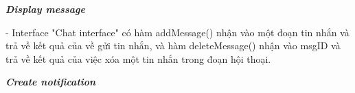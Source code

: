 \documentclass[a4paper]{article}
\begin{document}
\begin{itemize}
\begin{minipage}[b]{0.4\textwidth}
\end{minipage}
\hfill
{}
\newline
\newline
\textbf{\textit{Display message}} \\
\begin{minipage}[b]{0.4\textwidth}
- Interface "Chat interface" có hàm addMessage() nhận vào một đoạn tin nhắn và trả về kết quả của về gửi tin nhắn, và hàm deleteMessage() nhận vào msgID và trả về kết quả của việc xóa một tin nhắn trong đoạn hội thoại.
\end{minipage}
\hfill
{}
\newline
\newline
\textbf{\textit{Create notification}} \\


\end{itemize}
\end{document}
